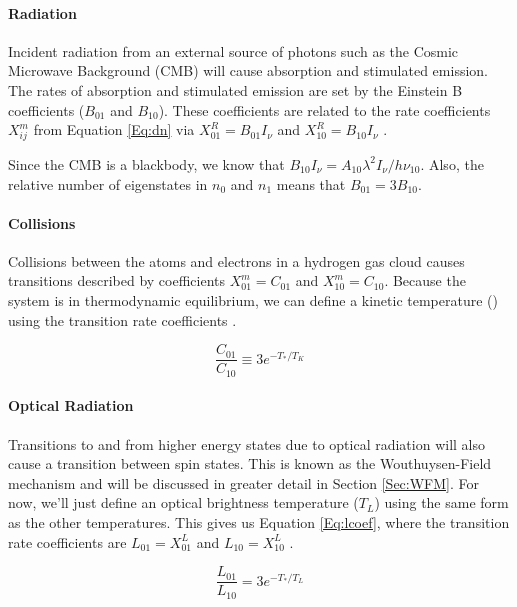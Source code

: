 \paragraph{\cm Radiation}
Incident radiation from an external source of \cm photons such as the Cosmic Microwave Background (CMB) will cause absorption and stimulated emission. The rates of absorption and stimulated emission are set by the Einstein B coefficients ($B_{01}$ and $B_{10}$). These coefficients are related to the rate coefficients $X^{m}_{ij}$ from Equation \ref{Eq:dn} via  $X^R_{01} = B_{01} I_\nu$ and $X^R_{10} = B_{10} I_{\nu}$ \cite{field_1958}. 

Since the CMB is a blackbody, we know that $B_{10} I_{\nu} = A_{10} \lambda^2 I_{\nu}/ h \nu_{10}$. Also, the relative number of eigenstates in $n_0$ and $n_1$ means that $B_{01} = 3 B_{10}$. 


\paragraph{Collisions}
Collisions between the atoms and electrons in a hydrogen gas cloud causes transitions described by coefficients $X^m_{01} = C_{01}$ and $X^m_{10} = C_{10}$. Because the system is in thermodynamic equilibrium, we can define a kinetic temperature (\tk) using the transition rate coefficients \cite{field_1958}. 

\begin{equation}
\frac{C_{01}}{C_{10}} \equiv 3 e^{-T_*/T_K}
\end{equation}

\paragraph{Optical Radiation}
Transitions to and from higher energy states due to optical radiation will also cause a transition between spin states. This is known as the Wouthuysen-Field mechanism \cite{wouthuysen_1952}\cite{field_1958} and will be discussed in greater detail in Section \ref{Sec:WFM}. For now, we'll just define an optical brightness temperature ($T_L$) using the same form as the other temperatures. This gives us Equation \ref{Eq:lcoef}, where the transition rate coefficients are $L_{01} = X^L_{01}$ and $L_{10} = X^L_{10}$ \cite{field_1958}. 

\begin{equation} \label{Eq:lcoef}
\frac{L_{01}}{L_{10}} = 3 e^{-T_*/T_L}
\end{equation}

